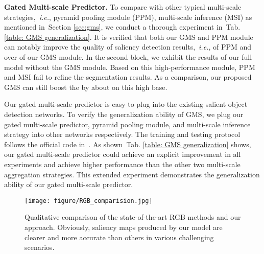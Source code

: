 \documentclass[journal]{IEEEtran}
\def\ie{{\em i.e.}}
\newcommand{\tabref}[1]{Tab. \ref{#1}}
\newcommand{\secref}[1]{Section \ref{#1}}
\begin{document}
\textbf{Gated Multi-scale Predictor.}
To compare with other typical multi-scale strategies,~\ie, pyramid pooling module (PPM), multi-scale inference (MSI) as mentioned in~\secref{sec:gms}, we conduct a thorough experiment in~\tabref{table: GMS generalization}. It is verified that both our GMS and PPM module can notably improve the quality of saliency detection results,~\ie,  of PPM and over  of our GMS module. In the second block, we exhibit the results of our full model without the GMS module. Based on this high-performance module, PPM and MSI fail to refine the segmentation results.
As a comparison, our proposed GMS can still boost the  by about  on this high base.


Our gated multi-scale predictor is easy to plug into the existing salient object detection networks. To verify the generalization ability of GMS, we plug our gated multi-scale predictor, pyramid pooling module, and multi-scale inference strategy into other networks respectively. The training and testing protocol follows the official code in~\cite{zhang2020uc}.
As shown~\tabref{table: GMS generalization} shows, our gated multi-scale predictor could achieve an explicit improvement in all experiments and achieve higher performance than the other two multi-scale aggregation strategies. This extended experiment demonstrates the generalization ability of our gated multi-scale predictor.




















\linespread{1}
\begin{figure}[t]
	\begin{center}
\texttt{[image: figure/RGB\_comparision.jpg]}
		\caption{Qualitative comparison of the state-of-the-art RGB methods and our approach. Obviously, saliency maps produced by our model are clearer and more accurate than others in various challenging scenarios.
		}\label{fig:RGB comparison}
	\end{center}
\end{figure}
\end{document}
